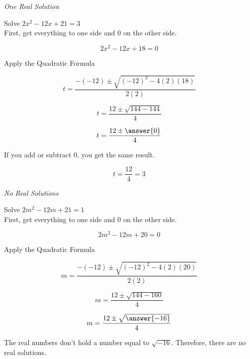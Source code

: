 \documentclass{ximera}
\begin{document}
\begin{example} \textit{One Real Solution}

Solve $2 x^2 - 12x + 21 = 3$ \\


First, get everything to one side and $0$ on the other side.



\[  2 x^2 - 12x + 18 = 0  \]

Apply the Quadratic Formula


\[   t = \frac{-(-12) \pm \sqrt{(-12)^2 - 4 (2) (18)}}{2 (2)}            \]



\[   t = \frac{12 \pm \sqrt{144 - 144}}{4}            \]

\[   t = \frac{12 \pm \answer{0}}{4}            \]

If you add or subtract $0$, you get the same result.

\[   t = \frac{12}{4}   = 3         \]







\end{example}








\begin{example} \textit{No Real Solutions}

Solve $2 m^2 - 12m + 21 = 1$ \\


First, get everything to one side and $0$ on the other side.



\[  2 m^2 - 12m + 20 = 0  \]

Apply the Quadratic Formula


\[   m = \frac{-(-12) \pm \sqrt{(-12)^2 - 4 (2) (20)}}{2 (2)}            \]

\[   m = \frac{12 \pm \sqrt{144 - 160}}{4}            \]

\[   m = \frac{12 \pm \sqrt{\answer{-16}}}{4}            \]



The real numbers don't hold a number equal to $\sqrt{-16}$.  Therefore, there are no real solutions.





\end{example}
\end{document}
